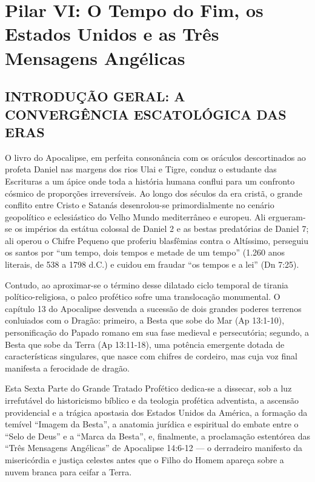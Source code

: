 \chapter{Pilar VI: O Tempo do Fim, os Estados Unidos e as Três Mensagens Angélicas}




\section{INTRODUÇÃO GERAL: A CONVERGÊNCIA ESCATOLÓGICA DAS ERAS}


O livro do Apocalipse, em perfeita consonância com os oráculos descortinados ao profeta Daniel nas margens dos rios Ulai e Tigre, conduz o estudante das Escrituras a um ápice onde toda a história humana conflui para um confronto cósmico de proporções irreversíveis. Ao longo dos séculos da era cristã, o grande conflito entre Cristo e Satanás desenrolou-se primordialmente no cenário geopolítico e eclesiástico do Velho Mundo mediterrâneo e europeu. Ali ergueram-se os impérios da estátua colossal de Daniel 2 e as bestas predatórias de Daniel 7; ali operou o Chifre Pequeno que proferiu blasfêmias contra o Altíssimo, perseguiu os santos por ``um tempo, dois tempos e metade de um tempo'' (1.260 anos literais, de 538 a 1798 d.C.) e cuidou em fraudar ``os tempos e a lei'' (Dn 7:25).

Contudo, ao aproximar-se o término desse dilatado ciclo temporal de tirania político-religiosa, o palco profético sofre uma translocação monumental. O capítulo 13 do Apocalipse desvenda a sucessão de dois grandes poderes terrenos conluiados com o Dragão: primeiro, a Besta que sobe do Mar (Ap 13:1-10), personificação do Papado romano em sua fase medieval e persecutória; segundo, a Besta que sobe da Terra (Ap 13:11-18), uma potência emergente dotada de características singulares, que nasce com chifres de cordeiro, mas cuja voz final manifesta a ferocidade de dragão.

Esta Sexta Parte do Grande Tratado Profético dedica-se a dissecar, sob a luz irrefutável do historicismo bíblico e da teologia profética adventista, a ascensão providencial e a trágica apostasia dos Estados Unidos da América, a formação da temível ``Imagem da Besta'', a anatomia jurídica e espiritual do embate entre o ``Selo de Deus'' e a ``Marca da Besta'', e, finalmente, a proclamação estentórea das ``Três Mensagens Angélicas'' de Apocalipse 14:6-12 — o derradeiro manifesto da misericórdia e justiça celestes antes que o Filho do Homem apareça sobre a nuvem branca para ceifar a Terra.



